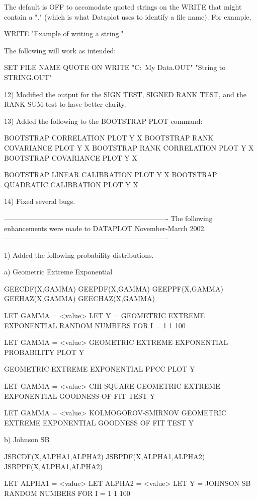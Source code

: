 {    The default is OFF to accomodate quoted strings on the WRITE
    that might contain a "." (which is what Dataplot uses to
    identify a file name).  For example,

       WRITE "Example of writing a string."

    The following will work as intended:

       SET FILE NAME QUOTE ON
       WRITE "C:\ My Data\STRING.OUT"  "String to STRING.OUT"

12) Modified the output for the SIGN TEST, SIGNED RANK TEST, and
    the RANK SUM test to have better clarity.
    
13) Added the following to the BOOTSTRAP PLOT command:

     BOOTSTRAP CORRELATION PLOT Y X
     BOOTSTRAP RANK COVARIANCE PLOT Y X
     BOOTSTRAP RANK CORRELATION PLOT Y X
     BOOTSTRAP COVARIANCE PLOT Y X

     BOOTSTRAP LINEAR CALIBRATION PLOT Y X
     BOOTSTRAP QUADRATIC CALIBRATION PLOT Y X

14) Fixed several bugs.

----------------------------------------------------------------------
The following enhancements were made to DATAPLOT November-March  2002.
----------------------------------------------------------------------

 1) Added the following probability distributions.

    a) Geometric Extreme Exponential

       GEECDF(X,GAMMA)
       GEEPDF(X,GAMMA)
       GEEPPF(X,GAMMA)
       GEEHAZ(X,GAMMA)
       GEECHAZ(X,GAMMA)

       LET GAMMA = <value>
       LET Y = GEOMETRIC EXTREME EXPONENTIAL RANDOM NUMBERS FOR I = 1 1 100

       LET GAMMA = <value>
       GEOMETRIC EXTREME EXPONENTIAL PROBABILITY PLOT Y

       GEOMETRIC EXTREME EXPONENTIAL PPCC PLOT Y

       LET GAMMA = <value>
       CHI-SQUARE GEOMETRIC EXTREME EXPONENTIAL GOODNESS OF FIT TEST Y

       LET GAMMA = <value>
       KOLMOGOROV-SMIRNOV GEOMETRIC EXTREME EXPONENTIAL GOODNESS OF FIT TEST Y

    b) Johnson SB

       JSBCDF(X,ALPHA1,ALPHA2)
       JSBPDF(X,ALPHA1,ALPHA2)
       JSBPPF(X,ALPHA1,ALPHA2)

       LET ALPHA1 = <value>
       LET ALPHA2 = <value>
       LET Y = JOHNSON SB RANDOM NUMBERS FOR I = 1 1 100

}
